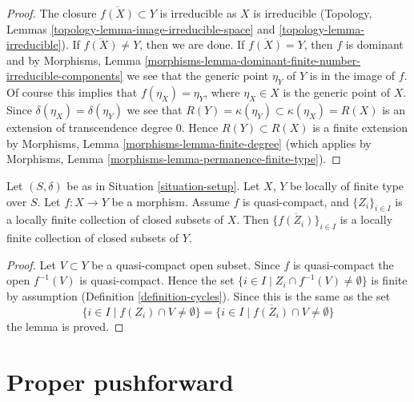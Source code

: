 \begin{proof}
The closure $\overline{f(X)} \subset Y$ is irreducible as $X$
is irreducible (Topology, Lemmas
\ref{topology-lemma-image-irreducible-space} and
\ref{topology-lemma-irreducible}).
If $\overline{f(X)} \not = Y$, then we are done.
If $\overline{f(X)} = Y$, then $f$ is dominant and by
Morphisms,
Lemma \ref{morphisms-lemma-dominant-finite-number-irreducible-components}
we see that the generic point $\eta_Y$ of $Y$ is in the image of $f$.
Of course this implies that $f(\eta_X) = \eta_Y$, where $\eta_X \in X$
is the generic point of $X$. Since $\delta(\eta_X) = \delta(\eta_Y)$
we see that $R(Y) = \kappa(\eta_Y) \subset \kappa(\eta_X) = R(X)$
is an extension of transcendence degree $0$.
Hence $R(Y) \subset R(X)$ is a finite extension by
Morphisms, Lemma \ref{morphisms-lemma-finite-degree}
(which applies by
Morphisms, Lemma \ref{morphisms-lemma-permanence-finite-type}).
\end{proof}

\begin{lemma}
\label{lemma-quasi-compact-locally-finite}
Let $(S, \delta)$ be as in Situation \ref{situation-setup}.
Let $X$, $Y$ be locally of finite type over $S$.
Let $f : X \to Y$ be a morphism.
Assume $f$ is quasi-compact, and $\{Z_i\}_{i \in I}$ is a locally
finite collection of closed subsets of $X$.
Then $\{\overline{f(Z_i)}\}_{i \in I}$ is a locally finite
collection of closed subsets of $Y$.
\end{lemma}

\begin{proof}
Let $V \subset Y$ be a quasi-compact open subset.
Since $f$ is quasi-compact the open $f^{-1}(V)$ is
quasi-compact. Hence the set
$\{i \in I \mid Z_i \cap f^{-1}(V) \not = \emptyset \}$
is finite by assumption (Definition \ref{definition-cycles}).
Since this is the same as the set
$$
\{i \in I \mid f(Z_i) \cap V \not = \emptyset \} =
\{i \in I \mid \overline{f(Z_i)} \cap V \not = \emptyset \}
$$
the lemma is proved.
\end{proof}









\section{Proper pushforward}
\label{section-proper-pushforward}

